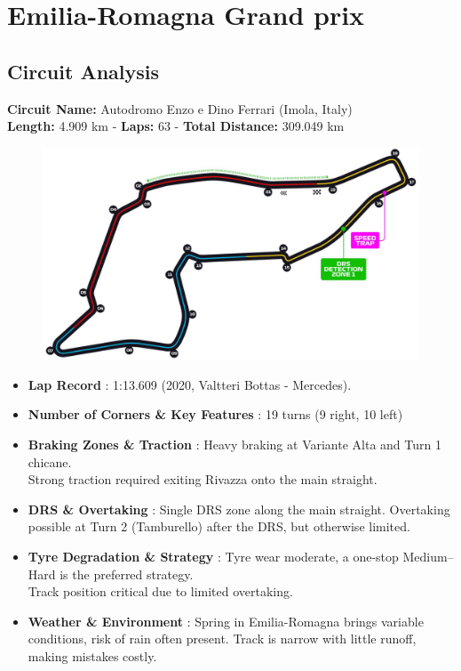 \section{Emilia-Romagna Grand prix}

\subsection{Circuit Analysis}

\textbf{Circuit Name:} Autodromo Enzo e Dino Ferrari (Imola, Italy) \\
\textbf{Length:} 4.909 km - \textbf{Laps:} 63 - \textbf{Total Distance:} 309.049 km

\begin{figure}[H]
    \centering
    \includegraphics[width=0.75\linewidth]{images/7.Emilia_Romagna_Circuit.jpg}
\end{figure}

\begin{itemize}
    \item \textbf{Lap Record} : 1:13.609 (2020, Valtteri Bottas - Mercedes).
    
    \item \textbf{Number of Corners \& Key Features} : 19 turns (9 right, 10 left)
    
    \item \textbf{Braking Zones \& Traction} : Heavy braking at Variante Alta and Turn 1 chicane.\\
    Strong traction required exiting Rivazza onto the main straight.
    
    \item \textbf{DRS \& Overtaking} : Single DRS zone along the main straight. Overtaking possible at Turn 2 (Tamburello) after the DRS, but otherwise limited.
    
    \item \textbf{Tyre Degradation \& Strategy} : Tyre wear moderate, a one-stop Medium–Hard is the preferred strategy.\\
    Track position critical due to limited overtaking.
    
    \item \textbf{Weather \& Environment} : Spring in Emilia-Romagna brings variable conditions, risk of rain often present. Track is narrow with little runoff, making mistakes costly.
\end{itemize}

